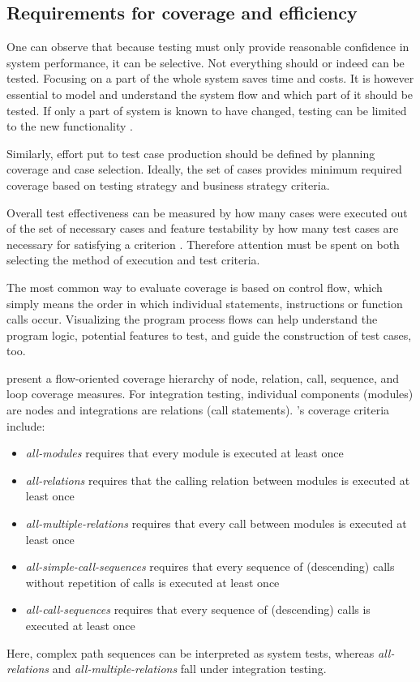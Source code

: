 \documentclass[12pt,a4paper,oneside,pdftex]{report}
\begin{document}
\subsection{Requirements for coverage and efficiency}

One can observe that because testing must only provide reasonable confidence in system performance, it can be selective. Not everything should or indeed can be tested. Focusing on a part of the whole system saves time and costs. It is however essential to model and understand the system flow and which part of it should be tested. If only a part of system is known to have changed, testing can be limited to the new functionality \citep{bhuyan2012survey}. 

Similarly, effort put to test case production should be defined by planning coverage and case selection. Ideally, the set of cases provides minimum required coverage based on testing strategy and business strategy criteria. 

Overall test effectiveness can be measured by how many cases were executed out of the set of necessary cases and feature testability by how many test cases are necessary for satisfying a criterion \citep{linnenkugel1990test}. Therefore attention must be spent on both selecting the method of execution and test criteria. 

The most common way to evaluate coverage is based on control flow, which simply means the order in which individual statements, instructions or function calls occur. Visualizing the program process flows can help understand the program logic, potential features to test, and guide the construction of test cases, too. \citep{burnstein2003practical} 

\citet{linnenkugel1990test} present a flow-oriented coverage hierarchy of node, relation, call, sequence, and loop coverage measures. For integration testing, individual components (modules) are nodes and integrations are relations (call statements). \citeauthor{linnenkugel1990test}'s \citeyearpar{linnenkugel1990test} coverage criteria include:
\begin{itemize}
\item \emph{all-modules} requires that every module is executed at least once 
\item \emph{all-relations} requires that the calling relation between modules is executed at least once
\item \emph{all-multiple-relations} requires that every call between modules is executed at least once
\item \emph{all-simple-call-sequences} requires that every sequence of (descending) calls without repetition of calls is executed at least once
\item \emph{all-call-sequences} requires that every sequence of (descending) calls is executed at least once
\end{itemize}
Here, complex path sequences can be interpreted as system tests, whereas \emph{all-relations} and \emph{all-multiple-relations} fall under integration testing.
\end{document}
